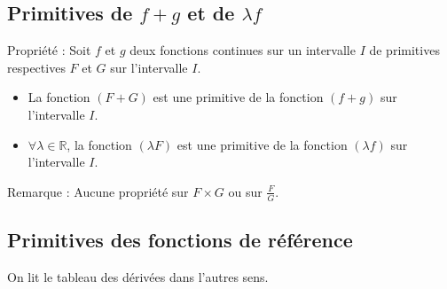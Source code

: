 \documentclass[11pt,a4paper]{article}
\begin{document}
\subsection{Primitives de $f + g$ et de $\lambda f$}

\begin{boiteProp}{Propriété :}
    Soit $f$ et $g$ deux fonctions continues sur un intervalle $I$ de primitives respectives $F$ et $G$ sur l'intervalle $I$.
    \begin{itemize}
        \item La fonction $(F + G)$ est une primitive de la fonction $(f + g)$ sur l'intervalle $I$.
        \item $\forall \lambda \in \mathbb{R}$, la fonction $(\lambda F)$ est une primitive de la fonction $(\lambda f)$ sur l'intervalle $I$.
    \end{itemize}
\end{boiteProp}

\begin{boiteRemarque}{Remarque :}
    Aucune propriété sur $F \times G$ ou sur $\frac{F}{G}$.
\end{boiteRemarque}

\subsection{Primitives des fonctions de référence}

On lit le tableau des dérivées dans l'autres sens.
\newline
\end{document}
